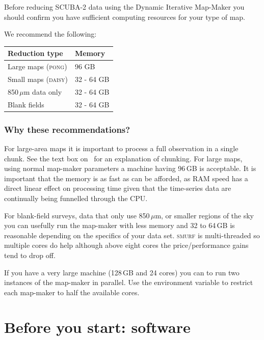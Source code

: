 \documentclass[11pt,oneside,chapters]{starlink}
\begin{document}
Before reducing SCUBA-2 data using the Dynamic Iterative Map-Maker you should confirm you have sufficient computing resources for your type of map.

We recommend the following:
\begin{table}[h!]
  \centering
  \begin{tabular}{ll}
    \hline
    \textbf{Reduction type} &\textbf{Memory} \\
    \hline
    Large maps (\textsc{pong})& 96 GB\\
    Small maps (\textsc{daisy})&32 - 64 GB\\
    850\,$\mu$m data only&32 - 64 GB\\
    Blank fields&32 - 64 GB\\
    \hline
  \end{tabular}
\end{table}

\subsubsection*{Why these recommendations?}

For large-area maps it is important to process a full observation in a
single chunk. See the text box on
\
for an explanation of chunking. For large maps, using normal map-maker
parameters a machine having 96\,GB is acceptable. It is important that
the memory is as fast as can be afforded, as RAM speed has a direct
linear effect on processing time given that the time-series data are
continually being funnelled through the CPU.

For blank-field surveys, data that only use 850\,$\mu$m, or smaller
regions of the sky you can usefully run the map-maker with less memory
and 32 to 64\,GB is reasonable depending on the specifics of your data
set. \textsc{smurf} is multi-threaded so multiple cores do help
although above eight cores the price/performance gains tend to drop
off.

If you have a very large machine (128\,GB and 24 cores) you can to run
two instances of the map-maker in parallel. Use the
 environment variable to restrict each
map-maker to half the available cores.


\section{Before you start: software}
\end{document}
